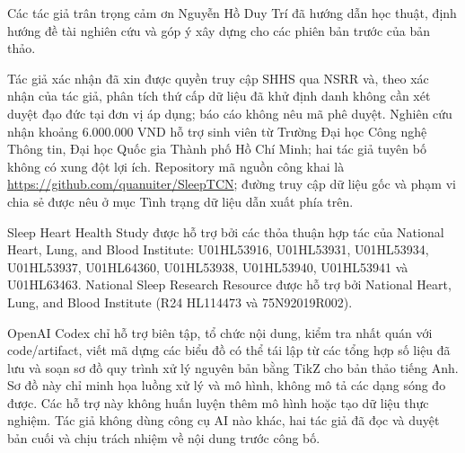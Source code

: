 Các tác giả trân trọng cảm ơn Nguyễn Hồ Duy Trí đã hướng dẫn học thuật, định hướng đề tài nghiên cứu và góp ý xây dựng cho các phiên bản trước của bản thảo.

Tác giả xác nhận đã xin được quyền truy cập SHHS qua NSRR và, theo xác nhận của tác giả, phân tích thứ cấp dữ liệu đã khử định danh không cần xét duyệt đạo đức tại đơn vị áp dụng; báo cáo không nêu mã phê duyệt. Nghiên cứu nhận khoảng 6.000.000 VND hỗ trợ sinh viên từ Trường Đại học Công nghệ Thông tin, Đại học Quốc gia Thành phố Hồ Chí Minh; hai tác giả tuyên bố không có xung đột lợi ích. Repository mã nguồn công khai là \url{https://github.com/quanuiter/SleepTCN}; đường truy cập dữ liệu gốc và phạm vi chia sẻ được nêu ở mục Tình trạng dữ liệu dẫn xuất phía trên.

Sleep Heart Health Study được hỗ trợ bởi các thỏa thuận hợp tác của National Heart, Lung, and Blood Institute: U01HL53916, U01HL53931, U01HL53934, U01HL53937, U01HL64360, U01HL53938, U01HL53940, U01HL53941 và U01HL63463. National Sleep Research Resource được hỗ trợ bởi National Heart, Lung, and Blood Institute (R24 HL114473 và 75N92019R002).

OpenAI Codex chỉ hỗ trợ biên tập, tổ chức nội dung, kiểm tra nhất quán với code/artifact, viết mã dựng các biểu đồ có thể tái lập từ các tổng hợp số liệu đã lưu và soạn sơ đồ quy trình xử lý nguyên bản bằng TikZ cho bản thảo tiếng Anh. Sơ đồ này chỉ minh họa luồng xử lý và mô hình, không mô tả các dạng sóng đo được. Các hỗ trợ này không huấn luyện thêm mô hình hoặc tạo dữ liệu thực nghiệm. Tác giả không dùng công cụ AI nào khác, hai tác giả đã đọc và duyệt bản cuối và chịu trách nhiệm về nội dung trước công bố.
\par\endgroup
